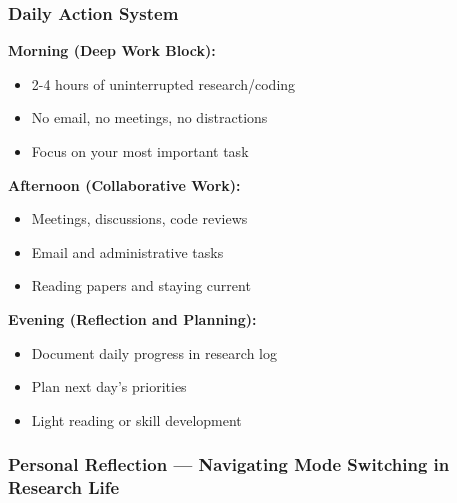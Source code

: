 \documentclass[11pt,a4paper]{article}
\begin{document}
\subsubsection{Daily Action System}

\begin{tcolorbox}[colback=green!10,colframe=green!50,title=The PhD Daily Routine]
\textbf{Morning (Deep Work Block):}
\begin{itemize}
    \item 2-4 hours of uninterrupted research/coding
    \item No email, no meetings, no distractions
    \item Focus on your most important task
\end{itemize}

\textbf{Afternoon (Collaborative Work):}
\begin{itemize}
    \item Meetings, discussions, code reviews
    \item Email and administrative tasks
    \item Reading papers and staying current
\end{itemize}

\textbf{Evening (Reflection and Planning):}
\begin{itemize}
    \item Document daily progress in research log
    \item Plan next day's priorities
    \item Light reading or skill development
\end{itemize}
\end{tcolorbox}

\subsubsection{Personal Reflection — Navigating Mode Switching in Research Life}
\end{document}

